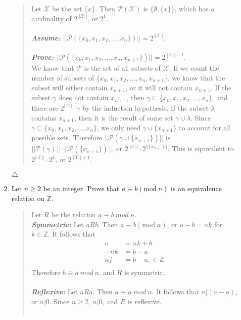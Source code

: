 \documentclass{article}
\newcommand{\ZZ}{\mathbb{Z}}
\begin{document}
\begin{enumerate}
\begin{enumerate}
\begin{quote}
Let $\mathcal{X}$ be the set $\{x\}$.
Then $\mathcal{P}(\mathcal{X})$ is $\{\emptyset,\{x\}\}$, which has a cardinality of $2^{||\mathcal{X}||}$, or $2 ^{1}$.\\\\
\textit{\textbf{Assume:}} $||\mathcal{P}(\{x_{0}, x_{1}, x_{2}, \ldots, x_{n}\})|| = 2^{||\mathcal{X}||}$. \\\\
\textit{\textbf{Prove:}} $||\mathcal{P}(\{x_{0}, x_{1}, x_{2}, \ldots,x_{n}, x_{n+1}\})|| = 2^{||\mathcal{X}|| + 1}$.\\
We know that $\mathcal{P}$ is the set of all subsets of $\mathcal{X}$.
If we count the number of subsets of $\{x_{0}, x_{1}, x_{2},\ldots,x_{n},x_{n+1}\}$, we know that the subset will either contain $x_{n+1}$, or it will not contain $x_{n+1}$.
If the subset $\gamma$ does not contain $x_{n+1}$, then $\gamma \subseteq \{x_{0},x_{1},x_{2},\ldots,x_{n}\}$, and there are $2^{||\mathcal{X}||}$ $\gamma$ by the induction hypothesis.
If the subset $\lambda$ contains $x_{n+1}$, then it is the result of some set $\gamma \cup \lambda$.
Since $\gamma \subseteq\{x_{0},x_{1},x_{2},\ldots,x_{n}\}$, we only need $\gamma \cup \{x_{n+1}\}$ to account for all possible sets.
Therefore $||\mathcal{P}(\gamma \cup \{x_{n+1}\})||$ is $||\mathcal{P}(\gamma)|| \cdot ||\mathcal{P}(\{x_{n+1}\})||$, or $2^{||\mathcal{X}||} \cdot 2^{||\{x_{n+1}\}||}$.
This is equivalent to $2^{||\mathcal{X}||}\cdot2^{1}$, or $2^{||\mathcal{X}|| + 1}$.
\end{quote}
$\triangle$
\item Let $n \geq 2$ be an integer.
Prove that $a \equiv b(\text{mod}\ n)$ is an equivalence relation on $\ZZ$.
\begin{quote}
Let $R$ be the relation $a\equiv b\ mod\ n$.\\
\textit{\textbf{Symmetric:}} Let $aRb$.
Then $a \equiv b(\text{mod}\ n)$, or $a - b = nk$ for $k\in\ZZ$.
It follows that
\begin{align*}
a &= nk + b\\
-nk &= b-a\\
nj &= b-a,\in\ZZ\\
\end{align*}
Therefore $b \equiv a\ mod\ n$, and $R$ is symmetric.\\\\
\textit{\textbf{Reflexive:}} Let $aRa$.
Then $a \equiv a\ mod\ n$.
It follows that $n|(a-a)$, or $n|0$.
Since $n \geq 2$, $n|0$, and $R$ is reflexive.\\\\

\end{quote}
\end{enumerate}
\end{enumerate}
\end{document}
